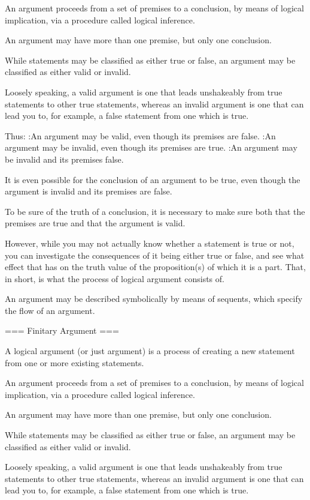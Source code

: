 An argument proceeds from a set of premises to a conclusion, by means of logical implication, via a procedure called logical inference.


An argument may have more than one premise, but only one conclusion.


While statements may be classified as either true or false, an argument may be classified as either valid or invalid.


Loosely speaking, a valid argument is one that leads unshakeably from true statements to other true statements, whereas an invalid argument is one that can lead you to, for example, a false statement from one which is true.


Thus:
:An argument may be valid, even though its premises are false.
:An argument may be invalid, even though its premises are true.
:An argument may be invalid and its premises false.

It is even possible for the conclusion of an argument to be true, even though the argument is invalid and its premises are false.


To be sure of the truth of a conclusion, it is necessary to make sure both that the premises are true and that the argument is valid.


However, while you may not actually know whether a statement is true or not, you can investigate the consequences of it being either true or false, and see what effect that has on the truth value of the proposition(s) of which it is a part. That, in short, is what the process of logical argument consists of.


An argument may be described symbolically by means of sequents, which specify the flow of an argument.


=== Finitary Argument ===

A logical argument (or just argument) is a process of creating a new statement from one or more existing statements.

An argument proceeds from a set of premises to a conclusion, by means of logical implication, via a procedure called logical inference.


An argument may have more than one premise, but only one conclusion.


While statements may be classified as either true or false, an argument may be classified as either valid or invalid.


Loosely speaking, a valid argument is one that leads unshakeably from true statements to other true statements, whereas an invalid argument is one that can lead you to, for example, a false statement from one which is true.


